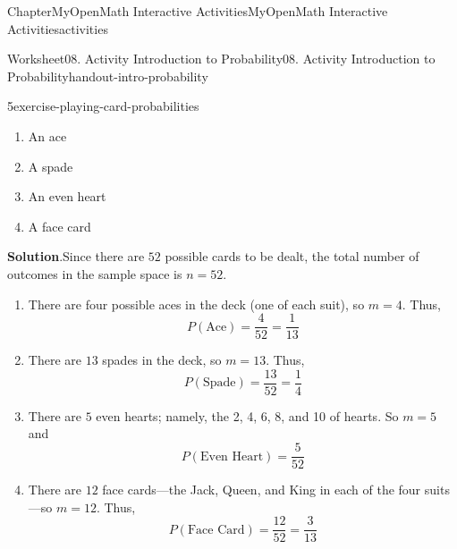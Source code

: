 \documentclass[oneside,10pt,]{book}
\newcommand{\blocktitlefont}{\relax}
\newlength{\fillinmaxwidth}
\newlength{\fillincontract}
\newlength{\charmaxwidth}\setlength{\charmaxwidth}{0.5em}
\newlength{\charminwidth}\setlength{\charminwidth}{0.1em}
\newlength{\fillinheight}
\newcommand{\fillintext}[1]{%
\setlength{\fillinmaxwidth}{#1\charmaxwidth}%
\setlength{\fillincontract}{#1\charminwidth}%
\setlength{\fillinheight}{\baselineskip}\addtolength{\fillinheight}{1.2pt}%
\strut\nobreak\leaders\vbox{\hrule width 0.3pt height 0.3pt \vskip -1.2pt}\hskip 1\fillinmaxwidth minus \fillincontract\nobreak\strut%
}
\begin{document}
\begin{chapterptx}{Chapter}{MyOpenMath Interactive Activities}{}{MyOpenMath Interactive Activities}{}{}{activities}
\begin{worksheet-section}{Worksheet}{08. Activity Introduction to Probability}{}{08. Activity Introduction to Probability}{}{}{handout-intro-probability}
\begin{divisionexercise}{5}{}{}{exercise-playing-card-probabilities}
\begin{enumerate}[label={\alph*}]
\item{}An ace%
\item{}A spade%
\item{}An even heart%
\item{}A face card%
\end{enumerate}
%
\par\smallskip%
\noindent\textbf{\blocktitlefont Solution}.\hypertarget{exercise-playing-card-probabilities-2}{}\quad{}Since there are \(52\) possible cards to be dealt, the total number of outcomes in the sample space is \(n = 52\).%
\par
%
\begin{enumerate}[label={\alph*}]
\item{}There are four possible aces in the deck (one of each suit), so \(m = 4\). Thus,%
\begin{equation*}
P(\text{Ace}) = \frac{4}{52} = \frac{1}{13}
\end{equation*}
%
\item{}There are \(13\) spades in the deck, so \(m = 13\). Thus,%
\begin{equation*}
P(\text{Spade}) = \frac{13}{52} = \frac{1}{4}
\end{equation*}
%
\item{}There are \(5\) even hearts; namely, the 2, 4, 6, 8, and 10 of hearts. So \(m = 5\) and%
\begin{equation*}
P(\text{Even Heart}) = \frac{5}{52}
\end{equation*}
%
\item{}There are \(12\) face cards—the Jack, Queen, and King in each of the four suits—so \(m = 12\). Thus,%
\begin{equation*}
P(\text{Face Card}) = \frac{12}{52} = \frac{3}{13}
\end{equation*}
%
\end{enumerate}
%
\end{divisionexercise}%
\clearpage
{}
\end{worksheet-section}
\end{chapterptx}
\end{document}
